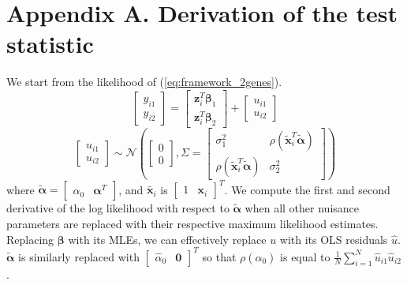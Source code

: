 \documentclass[aoas,authoryear, preprint]{imsart}
\numberwithin{equation}{section}
\theoremstyle{plain}
\begin{document}


 
\pagebreak
 
\section*{Appendix A. Derivation of the test statistic}
We start from the likelihood of (\ref{eq:framework_2genes}). 
\begin{equation*}
    \begin{bmatrix} y_{i1} \\ y_{i2} \end{bmatrix} = 
    \begin{bmatrix} \bm{z}_i^T\bm{\beta}_1 \\ \bm{z}_i^T \bm{\beta}_2 \end{bmatrix} + \begin{bmatrix} u_{i1} \\ u_{i2} \end{bmatrix}
\end{equation*}
\begin{equation*}
    \begin{bmatrix} u_{i1} \\ u_{i2} \end{bmatrix} \sim \mathcal{N} \left( 
    \begin{bmatrix} 0 \\0 \end{bmatrix}, \Sigma = \begin{bmatrix} \sigma_1^2 & \rho(\bm{\tilde{x}}_i^T\bm{\tilde{\alpha}}) \\ \rho(\bm{\tilde{x}}_i^T\bm{\tilde{\alpha}}) & \sigma_2^2 \end{bmatrix}\right)
\end{equation*}
where $\tilde{\bm{\alpha}} = \begin{bmatrix} \alpha_0& \bm{\alpha}^T \end{bmatrix}$, and $\tilde{\bm{x}_i}$ is $\begin{bmatrix} 1 & \bm{x}_i\end{bmatrix}^T$. 
We compute the first and second derivative of the log likelihood with respect to $\bm{\tilde{\alpha}}$ when all other nuisance parameters are replaced with their respective maximum likelihood estimates. Replacing $\bm{\beta}$ with its MLEs, we can effectively replace $u$ with its OLS residuals $\hat{u}$. $\bm{\tilde{\alpha}}$ is similarly replaced with $\begin{bmatrix} \hat{\alpha}_0 & \bm{0}\end{bmatrix}^T$ so that $\rho(\hat{\alpha}_0)$ is equal to $\frac{1}{N} \sum_{i=1}^{N} \hat{u}_{i1}\hat{u}_{i2}$. 
\end{document}
